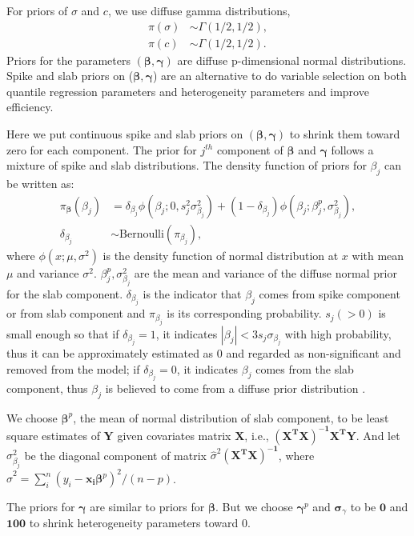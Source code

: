 \documentclass[12pt]{article}
\begin{document}
For priors of $\sigma$ and $c$, we use diffuse gamma distributions,
\begin{align*}
  \pi(\sigma) & \sim \Gamma (1/2, 1/2), \\
  \pi(c) & \sim \Gamma(1/2, 1/2).
\end{align*}
Priors for the parameters $(\bm{\beta}, \bm{\gamma})$ are diffuse
p-dimensional normal distributions.  Spike and slab priors on ($\bm \beta,
\bm \gamma$) are an alternative to do variable selection on both
quantile regression parameters and heterogeneity parameters and
improve efficiency.

Here we put continuous spike and slab priors on $(\bm \beta, \bm
\gamma)$ to shrink them toward zero for each component. The prior for
$j^{th}$ component of $\bm \beta$ and $\bm \gamma$ follows a mixture
of spike and slab distributions.  The density function of priors for
$\beta_j$ can be written as:
\begin{align*}
  \pi_{\bm \beta} (\beta_j) &= \delta_{\beta_j} \phi(\beta_j; 0, s_j^2
  \sigma_{\beta_j}^2) +
  (1- \delta_{\beta_j}) \phi(\beta_j; \beta_j^p, \sigma_{\beta_j}^2),\\
  \delta_{\beta_j} & \sim \mbox{Bernoulli} (\pi_{\beta_j}),
\end{align*}
where $\phi(x; \mu, \sigma^2)$ is the density function of normal
distribution at $x$ with mean $\mu$ and variance
$\sigma^2$. $\beta_j^p, \sigma_{\beta_j}^2$ are the mean and variance
of the diffuse normal prior for the slab component.
$\delta_{\beta_j}$ is the indicator that $\beta_j$ comes from spike
component or from slab component and $\pi_{\beta_j}$ is its corresponding
probability.  $s_j (>0)$ is small enough so that if $\delta_{\beta_j}
= 1$, it indicates $|\beta_j | < 3 s_j\sigma_{\beta_j}$ with high
probability, thus it can be approximately estimated as 0 and regarded
as non-significant and removed from the model; if $\delta_{\beta_j} =
0$, it indicates $\beta_j$ comes from the slab component, thus
$\beta_j$ is believed to come from a diffuse prior distribution
\citep{george1993}.

We choose $\bm \beta^p$, the mean of normal distribution of slab
component, to be least square estimates of $\bm Y$ given covariates
matrix $\bm X$, i.e., $\bm{(X^TX)^{-1}X^TY}$. And let
$\sigma_{\beta_j}^2$ be the diagonal component of matrix
$\hat{\sigma}^2 \bm{(X^TX)^{-1}}$, where $\hat{\sigma}^2 = \sum_i^n
(y_i - \bm{x_i\beta}^p)^2/(n - p)$.

The priors for $\bm \gamma$ are similar to priors for $\bm \beta$. But
we choose $\bm \gamma^p$ and $\bm \sigma_{\gamma}$ to be $\bm 0$ and
$\bm{100}$ to shrink heterogeneity parameters toward 0.
\end{document}
